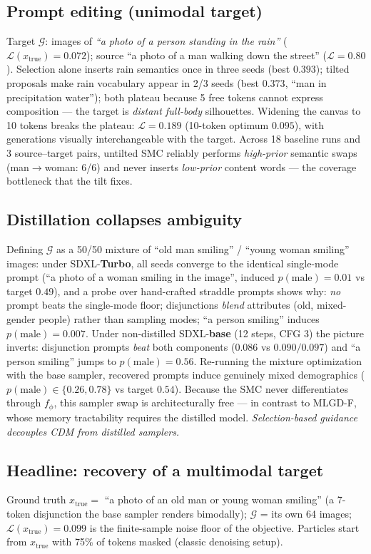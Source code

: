 \documentclass[11pt]{article}
\newcommand{\G}{\mathcal{G}}
\newcommand{\Ploss}{\mathcal{L}}
\begin{document}
\subsection{Prompt editing (unimodal target)}
Target $\G$: images of \emph{``a photo of a person standing in the rain''}
($\Ploss(x_{\mathrm{true}}) = 0.072$); source ``a photo of a man walking
down the street'' ($\Ploss = 0.80$). Selection alone inserts rain
semantics once in three seeds (best $0.393$); tilted proposals make rain
vocabulary appear in 2/3 seeds (best $0.373$, ``man in precipitation
water''); both plateau because 5 free tokens cannot express composition
--- the target is \emph{distant full-body} silhouettes. Widening the
canvas to 10 tokens breaks the plateau: $\Ploss = 0.189$
(10-token optimum $0.095$), with generations visually interchangeable
with the target. Across 18 baseline runs and 3 source--target pairs,
untilted SMC reliably performs \emph{high-prior} semantic swaps
(man$\to$woman: 6/6) and never inserts \emph{low-prior} content words ---
the coverage bottleneck that the tilt fixes.

\subsection{Distillation collapses ambiguity}
\label{sec:distill}
Defining $\G$ as a 50/50 mixture of ``old man smiling'' / ``young woman
smiling'' images: under SDXL-\textbf{Turbo}, all seeds converge to the
identical single-mode prompt (``a photo of a woman smiling in the image'',
induced $p(\mathrm{male}){=}0.01$ vs target $0.49$), and a probe over
hand-crafted straddle prompts shows why: \emph{no} prompt beats the
single-mode floor; disjunctions \emph{blend} attributes (old, mixed-gender
people) rather than sampling modes; ``a person smiling'' induces
$p(\mathrm{male}) = 0.007$. Under non-distilled SDXL-\textbf{base}
(12 steps, CFG 3) the picture inverts: disjunction prompts \emph{beat}
both components ($0.086$ vs $0.090/0.097$) and ``a person smiling'' jumps
to $p(\mathrm{male}) = 0.56$. Re-running the mixture optimization with the
base sampler, recovered prompts induce genuinely mixed demographics
($p(\mathrm{male}) \in \{0.26, 0.78\}$ vs target $0.54$). Because the SMC
never differentiates through $f_\phi$, this sampler swap is architecturally
free --- in contrast to MLGD-F, whose memory tractability requires the
distilled model. \emph{Selection-based guidance decouples CDM from
distilled samplers.}

\subsection{Headline: recovery of a multimodal target}
\label{sec:headline}
Ground truth $x_{\mathrm{true}} = $ ``a photo of an old man or young woman
smiling'' (a 7-token disjunction the base sampler renders bimodally);
$\G$ = its own 64 images; $\Ploss(x_{\mathrm{true}}) = 0.099$ is the
finite-sample noise floor of the objective. Particles start from
$x_{\mathrm{true}}$ with 75\% of tokens masked (classic denoising setup).
\end{document}
